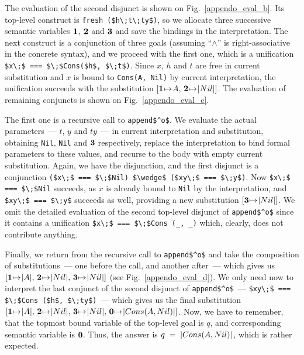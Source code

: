 The evaluation of the second disjunct is shown on Fig.~\ref{appendo_eval_b}. Its top-level construct is \lstinline|fresh ($h\;t\;ty$)|, so we allocate three successive 
semantic variables $\mbox{\textbf{1}}$, $\mbox{\textbf{2}}$ and $\mbox{\textbf{3}}$ and save the bindings in the interpretation. The next construct is a conjunction of three goals (assuming
``$\wedge$'' is right-associative in the concrete syntax), and we proceed with the first one, which is a unification \mbox{\lstinline|$x\;$ === $\;$Cons($h$, $\;t$)|}. 
Since $x$, $h$ and $t$ are free in current substitution and $x$ is bound to \lstinline|Cons(A, Nil)| by current interpretation, the unification succeeds with the 
substitution \mbox{$[\bnd{\sv{1}}{\lstinline{A}},\,\bnd{\sv{2}}{\lstinline|Nil|}]$}. The evaluation of remaining conjuncts is shown on Fig.~\ref{appendo_eval_c}.

\FloatBarrier
The first one is a recursive call to \lstinline|append$^o$|. We evaluate the actual parameters~--- $t$, $y$ and $ty$~--- in current interpretation and substitution, 
obtaining \lstinline|Nil|, \lstinline|Nil| and $\mbox{\textbf{3}}$ respectively, replace the interpretation to bind formal parameters to these values, and recurse to the body with
empty current substitution. Again, we have the disjunction, and the first disjunct is a conjunction \mbox{\lstinline|($x\;$ === $\;$Nil) $\wedge$ ($xy\;$ === $\;y$)|}.
Now \mbox{\lstinline|$x\;$ === $\;$Nil|} succeeds, as $x$ is already bound to \lstinline|Nil| by the interpretation, and \mbox{\lstinline|$xy\;$ === $\;y$|} succeeds
as well, providing a new substitution \mbox{$[\bnd{\sv{3}}{\lstinline|Nil|}]$}. We omit the detailed evaluation of the second top-level disjunct of \lstinline|append$^o$| since
it contains a unification \lstinline|$x\;$ === $\;$Cons (_, _)| which, clearly, does not contribute anything.

Finally, we return from the recursive call to \lstinline|append$^o$| and take the composition of substitutions~--- one before the call, and another after~--- which
gives us \mbox{$[\bnd{\sv{1}}{\lstinline|A|},\,\bnd{\sv{2}}{\lstinline|Nil|},\,\bnd{\sv{3}}{\lstinline|Nil|}]$} (see Fig.~\ref{appendo_eval_d}). We only need now to 
interpret the last conjunct of the second disjunct of \lstinline|append$^o$|~--- \mbox{\lstinline|$xy\;$ === $\;$Cons ($h$, $\;ty$)|}~--- which gives us the
final substitution \mbox{$[\bnd{\sv{1}}{\lstinline|A|},\,\bnd{\sv{2}}{\lstinline|Nil|},\,\bnd{\sv{3}}{\lstinline|Nil|},\,\bnd{\sv{0}}{\lstinline|Cons (A, Nil)|}]$}. Now, we
have to remember, that the topmost bound variable of the top-level goal is $q$, and corresponding semantic variable is $\mbox{\textbf{0}}$. Thus, the answer is 
\mbox{$q\;=\;\lstinline|Cons (A, Nil)|$}, which is rather expected.
